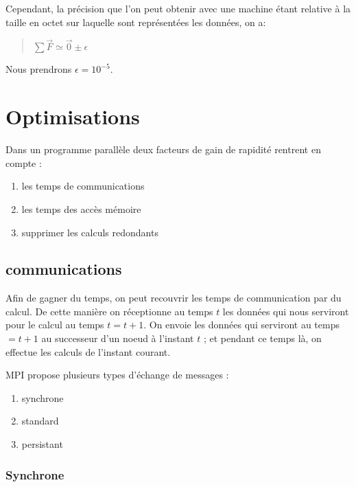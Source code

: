 \par Cependant, la précision que l'on peut obtenir avec une machine étant relative à 
la taille en octet sur laquelle sont représentées les données, on a:
\begin{quote}
  \begin{center}
    $\sum \overrightarrow{F} \simeq \overrightarrow{0} \pm \epsilon$
  \end{center}
\end{quote}
Nous prendrons $\epsilon = 10^{-5}$.

\section{Optimisations}

\par Dans un programme parallèle deux facteurs de gain de rapidité rentrent en compte : 
\begin{enumerate}
\item les temps de communications
\item les temps des accès mémoire
\item supprimer les calculs redondants
\end{enumerate}

\subsection{communications}

\par Afin de gagner du temps, on peut recouvrir les temps de communication par du calcul. De
cette manière on réceptionne au temps $t$ les données qui nous serviront pour le
calcul au temps $t=t+1$. On envoie les données qui serviront au temps $=t+1$
au successeur d'un noeud à l'instant $t$ ; et pendant ce temps là, on effectue les calculs 
de l'instant courant.\\

\par MPI propose plusieurs types d'échange de messages :\\
\begin{enumerate}
\item synchrone
\item standard
\item persistant
\end{enumerate}

\subsubsection{Synchrone}

